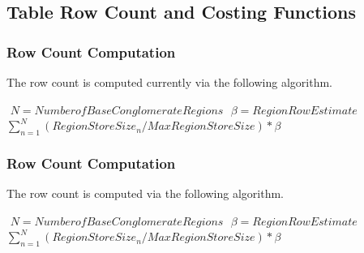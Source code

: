 \subsection{Table Row Count and Costing Functions}

\subsubsection{Row Count Computation}

The row count is computed currently via the following algorithm.

$ $
$ N=Number of Base Conglomerate Regions$
$ $
$ \beta=Region Row Estimate $
$ $
$\sum_{n=1}^{N}(RegionStoreSize_n/MaxRegionStoreSize)*\beta$
$ $

\subsubsection{Row Count Computation}

The row count is computed via the following algorithm.

$ $
$ N=Number of Base Conglomerate Regions$
$ $
$ \beta=Region Row Estimate $
$ $
$\sum_{n=1}^{N}(RegionStoreSize_n/MaxRegionStoreSize)*\beta$
$ $


